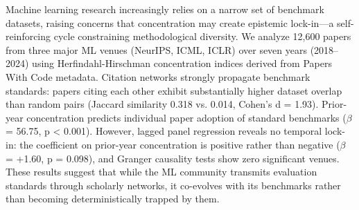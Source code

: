 
Machine learning research increasingly relies on a narrow set of benchmark datasets, raising concerns that concentration may create epistemic lock-in---a self-reinforcing cycle constraining methodological diversity. We analyze 12,600 papers from three major ML venues (NeurIPS, ICML, ICLR) over seven years (2018--2024) using Herfindahl-Hirschman concentration indices derived from Papers With Code metadata. Citation networks strongly propagate benchmark standards: papers citing each other exhibit substantially higher dataset overlap than random pairs (Jaccard similarity 0.318 vs. 0.014, Cohen's d = 1.93). Prior-year concentration predicts individual paper adoption of standard benchmarks ($\beta$ = 56.75, p < 0.001). However, lagged panel regression reveals no temporal lock-in: the coefficient on prior-year concentration is positive rather than negative ($\beta$ = +1.60, p = 0.098), and Granger causality tests show zero significant venues. These results suggest that while the ML community transmits evaluation standards through scholarly networks, it co-evolves with its benchmarks rather than becoming deterministically trapped by them.

